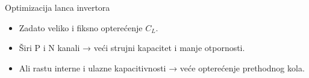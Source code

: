 \begin{frame}[label=09_3-s014]{Optimizacija lanca invertora}
\begin{center}

\end{center}\begin{itemize}
\item Zadato veliko i fiksno opterećenje $C_L$.
\item Širi P i N kanali → veći strujni kapacitet i manje otpornosti.
\item Ali rastu interne i ulazne kapacitivnosti → \alert{veće opterećenje prethodnog kola}.
\end{itemize}
\end{frame}
